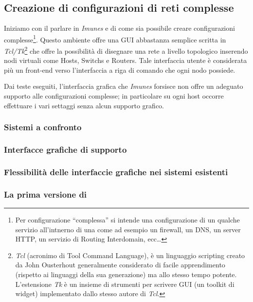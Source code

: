 \subsection{Creazione di configurazioni di reti complesse}
Iniziamo con il parlare in \emph{Imunes} e di come sia possibile creare configurazioni complesse\footnote{Per configurazione ``complessa'' si intende una configurazione di un qualche servizio all'intnerno di una \virtualmachine come ad esempio un firewall, un DNS, un server HTTP, un servizio di Routing Interdomain, ecc\ldots}.
Questo ambiente offre una GUI abbastanza semplice scritta in \emph{Tcl/Tk}\footnote{\emph{Tcl} (acronimo di Tool Command Language), è un linguaggio scripting creato da John Ousterhout generalmente considerato di facile apprendimento (rispetto ai linguaggi della sua generazione) ma allo stesso tempo potente. L'estensione \emph{Tk} è un insieme di strumenti per scrivere GUI (un toolkit di widget) implementato dallo stesso autore di \emph{Tcl}.} che offre la possibilità di disegnare una rete a livello topologico inserendo nodi virtuali come Hosts, Switchs e Routers. Tale interfaccia utente è considerata più un front-end verso l'interfaccia a riga di comando che ogni nodo possiede.

Dai teste eseguiti, l'interfaccia grafica che \emph{Imunes} forsisce non offre un adeguato supporto alle configurazioni complesse; in particolare su ogni host occorre effettuare i vari settaggi senza alcun supporto grafico.

\subsubsection{Sistemi a confronto}

\subsubsection{Interfacce grafiche di supporto}

\subsubsection{Flessibilità delle interfaccie grafiche nei sistemi esistenti}

\subsubsection{La prima versione di \visualnetkit{}}


